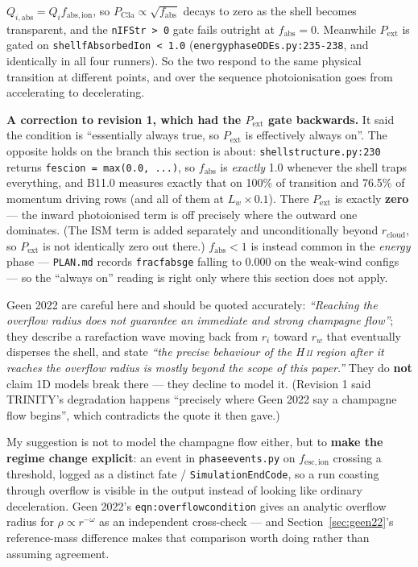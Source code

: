 \documentclass[11pt,a4paper,oneside]{report}
\newcommand{\brkus}{\textunderscore\allowbreak}
\newcommand{\code}[1]{\texttt{\small\let\_\brkus #1}}
\newcommand{\lbl}[1]{\texttt{\footnotesize\let\_\brkus #1}}
\newcommand{\Pext}{P_{\mathrm{ext}}}
\newcommand{\PCa}{P_{\mathrm{C3a}}}
\newcommand{\up}[1]{\textcolor{tqaccent}{\textbf{#1}}}
\begin{document}
$Q_{i,\mathrm{abs}}=Q_i f_{\mathrm{abs,ion}}$, so $\PCa\propto\sqrt{f_{\mathrm{abs}}}$ decays
to zero as the shell becomes transparent, and the \code{n\_IF\_Str > 0} gate fails outright at
$f_{\mathrm{abs}}=0$. Meanwhile $\Pext$ is gated on \code{shell\_fAbsorbedIon < 1.0}
(\code{energy\_phase\_ODEs.py:235-238}, and identically in all four runners). So the two respond to
the same physical transition at different points, and over the sequence photoionisation goes from
accelerating to decelerating.

\begin{keybox}
\textbf{\sffamily A correction to revision 1, which had the $\Pext$ gate backwards.} It said the
condition is ``essentially always true, so $\Pext$ is effectively always on''. The opposite holds on
the branch this section is about: \code{shell\_structure.py:230} returns
\code{f\_esc\_ion = max(0.0, ...)}, so $f_{\mathrm{abs}}$ is \emph{exactly} 1.0 whenever the shell
traps everything, and B11.0 measures exactly that on 100\% of transition and 76.5\% of momentum
driving rows (and all of them at $L_w\times0.1$). There $\Pext$ is exactly \up{zero} --- the inward
photoionised term is off precisely where the outward one dominates. (The ISM term is added separately
and unconditionally beyond $r_{\mathrm{cloud}}$, so $\Pext$ is not identically zero out there.)
$f_{\mathrm{abs}}<1$ is instead common in the \emph{energy} phase --- \code{PLAN.md} records
\code{frac\_fabs\_ge\_099} falling to 0.000 on the weak-wind configs --- so the ``always on'' reading
is right only where this section does not apply.
\end{keybox}

Geen 2022 are careful here and should be quoted accurately: \emph{``Reaching the overflow
radius does not guarantee an immediate and strong champagne flow''}; they describe a
rarefaction wave moving back from $r_i$ toward $r_w$ that eventually disperses the shell, and
state \emph{``the precise behaviour of the H\,\textsc{ii} region after it reaches the overflow radius is
mostly beyond the scope of this paper.''} They do \up{not} claim 1D models break there ---
they decline to model it. (Revision 1 said TRINITY's degradation happens ``precisely where
Geen 2022 say a champagne flow begins'', which contradicts the quote it then gave.)

My suggestion is not to model the champagne flow either, but to \up{make the regime change
explicit}: an event in \code{phase\_events.py} on $f_{\mathrm{esc,ion}}$ crossing a threshold,
logged as a distinct fate / \code{SimulationEndCode}, so a run coasting through overflow is
visible in the output instead of looking like ordinary deceleration. Geen 2022's
\lbl{eqn:overflowcondition} gives an analytic overflow radius for $\rho\propto r^{-\omega}$ as
an independent cross-check --- and Section~\ref{sec:geen22}'s reference-mass difference makes
that comparison worth doing rather than assuming agreement.
\end{document}
